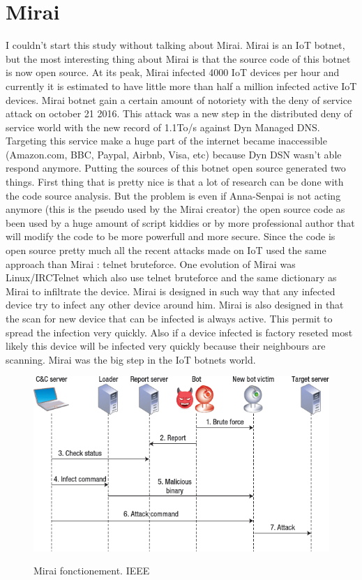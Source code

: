 \documentclass{report}
\begin{document}
\section{Mirai}
I couldn't start this study without talking about Mirai. Mirai is an IoT botnet, but the most interesting thing about Mirai is that the source code of this botnet is now open source. At its peak, Mirai infected 4000 IoT devices
per hour and currently it is estimated to have little more than half a million infected active IoT devices\autocite{angrishi2017turning}. Mirai botnet gain a certain amount of notoriety with the deny of service attack on october 21 2016. This attack was a new step in the distributed deny of service world with the new record of 1.1To/s against Dyn Managed DNS. Targeting this service make a huge part of the internet became inaccessible (Amazon.com, BBC, Paypal, Airbnb, Visa, etc) because Dyn DSN wasn't able respond anymore.\newline
Putting the sources of this botnet open source generated two things. First thing that is pretty nice is that a lot of research can be done with the code source analysis. But the problem is even if Anna-Senpai is not acting anymore (this is the pseudo used by the Mirai creator) the open source code as been used by a huge amount of script kiddies or by more professional author that will modify the code to be more powerfull and more secure. Since the code is open source pretty much all the recent attacks made on IoT used the same approach than Mirai : telnet bruteforce.
One evolution of Mirai was Linux/IRCTelnet which also use telnet bruteforce and the same dictionary as Mirai to infiltrate the device.\newline
\newline
Mirai is designed in such way that any infected device try to infect any other device around him. Mirai is also designed in that the scan for new device that can be infected is always active. This permit to spread the infection very quickly. Also if a device infected is factory reseted most likely this device will be infected very quickly because their neighbours are scanning. Mirai was the big step in the IoT botnets world.\newline
\newline
\begin{figure}[h]
 \caption{Mirai fonctionement. IEEE\autocite{kolias2017ddos}}
 \centering
 \includegraphics[width=1.2\textwidth]{./img/botnet-fonct}
 \label{fig:botnet-fonct}
\end{figure}
\end{document}
